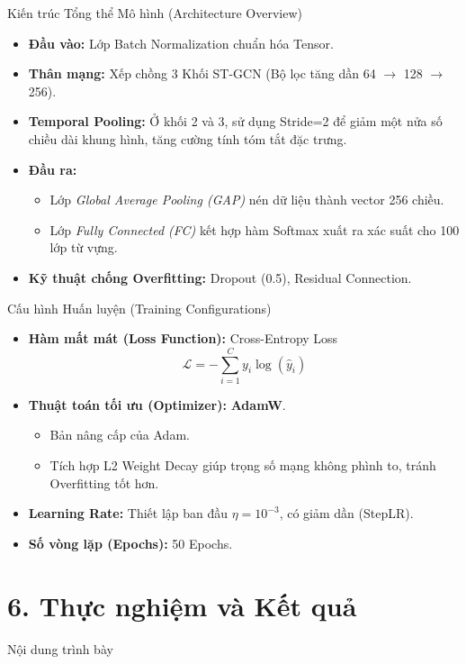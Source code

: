 \documentclass[aspectratio=169]{beamer}
\begin{document}
\begin{frame}{Kiến trúc Tổng thể Mô hình (Architecture Overview)}
    \begin{itemize}
        \item \textbf{Đầu vào:} Lớp Batch Normalization chuẩn hóa Tensor.
        \item \textbf{Thân mạng:} Xếp chồng 3 Khối ST-GCN (Bộ lọc tăng dần 64 $\to$ 128 $\to$ 256).
        \item \textbf{Temporal Pooling:} Ở khối 2 và 3, sử dụng Stride=2 để giảm một nửa số chiều dài khung hình, tăng cường tính tóm tắt đặc trưng.
        \item \textbf{Đầu ra:} 
        \begin{itemize}
            \item Lớp \textit{Global Average Pooling (GAP)} nén dữ liệu thành vector 256 chiều.
            \item Lớp \textit{Fully Connected (FC)} kết hợp hàm Softmax xuất ra xác suất cho 100 lớp từ vựng.
        \end{itemize}
        \item \textbf{Kỹ thuật chống Overfitting:} Dropout (0.5), Residual Connection.
    \end{itemize}
\end{frame}

\begin{frame}{Cấu hình Huấn luyện (Training Configurations)}
    \begin{itemize}
        \item \textbf{Hàm mất mát (Loss Function):} Cross-Entropy Loss
        \[ \mathcal{L} = -\sum_{i=1}^{C} y_i \log(\hat{y}_i) \]
        \item \textbf{Thuật toán tối ưu (Optimizer):} \textbf{AdamW}.
        \begin{itemize}
            \item Bản nâng cấp của Adam.
            \item Tích hợp L2 Weight Decay giúp trọng số mạng không phình to, tránh Overfitting tốt hơn.
        \end{itemize}
        \item \textbf{Learning Rate:} Thiết lập ban đầu $\eta = 10^{-3}$, có giảm dần (StepLR).
        \item \textbf{Số vòng lặp (Epochs):} 50 Epochs.
    \end{itemize}
\end{frame}

\section{6. Thực nghiệm và Kết quả}
\begin{frame}{Nội dung trình bày}
\end{frame}
\end{document}
